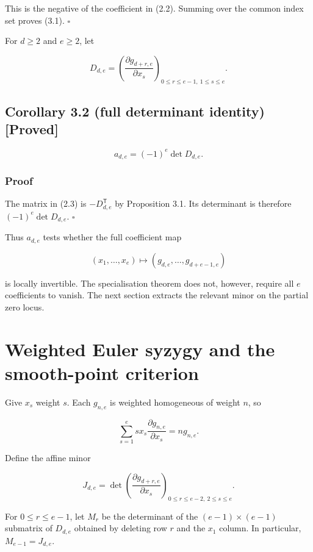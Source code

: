 \documentclass[
]{article}
\begin{document}
This is the negative of the coefficient in (2.2). Summing over the
common index set proves (3.1). \(\square\)

For \(d\ge2\) and \(e\ge2\), let

\[
D_{d,e}=\left(
\frac{\partial g_{d+r,e}}{\partial x_s}
\right)_{0\le r\le e-1,\ 1\le s\le e}.
\]

\subsection*{Corollary 3.2 (full determinant identity)
{[}Proved{]}}\label{corollary-3.2-full-determinant-identity-proved}

\[
\boxed{a_{d,e}=(-1)^e\det D_{d,e}.}
\tag{3.2}
\]

\subsubsection*{Proof}\label{proof-2}

The matrix in (2.3) is \(-D_{d,e}^{\mathsf T}\) by Proposition 3.1. Its
determinant is therefore \((-1)^e\det D_{d,e}\). \(\square\)

Thus \(a_{d,e}\) tests whether the full coefficient map

\[
(x_1,\ldots,x_e)\longmapsto
(g_{d,e},\ldots,g_{d+e-1,e})
\]

is locally invertible. The specialisation theorem does not, however,
require all \(e\) coefficients to vanish. The next section extracts the
relevant minor on the partial zero locus.

\section{Weighted Euler syzygy and the smooth-point
criterion}\label{weighted-euler-syzygy-and-the-smooth-point-criterion}

Give \(x_s\) weight \(s\). Each \(g_{n,e}\) is weighted homogeneous of
weight \(n\), so

\[
\sum_{s=1}^e sx_s\frac{\partial g_{n,e}}{\partial x_s}=ng_{n,e}.
\tag{4.1}
\]

Define the affine minor

\[
J_{d,e}=\det\left(
\frac{\partial g_{d+r,e}}{\partial x_s}
\right)_{0\le r\le e-2,\ 2\le s\le e}.
\tag{4.2}
\]

For \(0\le r\le e-1\), let \(M_r\) be the determinant of the
\((e-1)\times(e-1)\) submatrix of \(D_{d,e}\) obtained by deleting row
\(r\) and the \(x_1\) column. In particular, \(M_{e-1}=J_{d,e}\).
\end{document}
